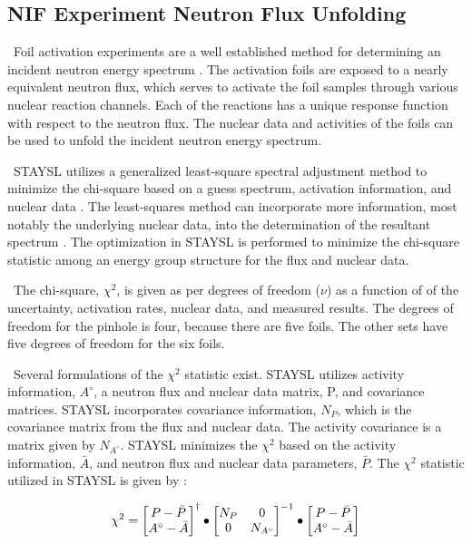\documentclass[journal]{IEEEtran}
\begin{document}
\subsection{NIF Experiment Neutron Flux Unfolding}

\ Foil activation experiments are a well established method for determining an incident neutron energy spectrum \cite{Knoll,Reginatto2010,Vagena2018b}. The activation foils are exposed to a nearly equivalent neutron flux, which serves to activate the foil samples through various nuclear reaction channels. Each of the reactions has a unique response function with respect to the neutron flux. The nuclear data and activities of the foils can be used to unfold the incident neutron energy spectrum.

\ STAYSL utilizes a generalized least-square spectral adjustment method to minimize the chi-square based on a guess spectrum, activation information, and nuclear data \cite{Perey1977}. The least-squares method can incorporate more information, most notably the underlying nuclear data, into the determination of the resultant spectrum \cite{Perey1977}. The optimization in STAYSL is performed to minimize the chi-square statistic among an energy group structure for the flux and nuclear data. 

\ The chi-square, $\chi^{2}$, is given as per degrees of freedom ($\nu$) as a function of of the uncertainty, activation rates, nuclear data, and measured results. The degrees of freedom for the pinhole is four, because there are five foils. The other sets have five degrees of freedom for the six foils. 

\ Several formulations of the $\chi^{2}$ statistic exist. STAYSL utilizes activity information, $A^{\circ}$, a neutron flux and nuclear data matrix, P, and covariance matrices. STAYSL incorporates covariance information, $N_{P}$, which is the covariance matrix from the flux and nuclear data. The activity covariance is a matrix given by $N_{A^{\circ}}$. STAYSL minimizes the $\chi^{2}$ based on the activity information, $\bar{A}$, and neutron flux and nuclear data parameters, $\bar{P}$. The $\chi^{2}$ statistic utilized in STAYSL is given by \cite{Perey1977}:
	
	\begin{equation} \label{eq:LeastSq}
	\chi^{2} = \begin{bmatrix}
	P-\bar{P} \\
	A^{\circ}-\bar{A}    
	\end{bmatrix}^{\dagger}
	\space 
	\bullet
	\space 
	\begin{bmatrix}
	N_{P}  &  0      \\
	0  &  N_{A^{\circ}}     
	\end{bmatrix}^{-1}
	\space
	\bullet
	\space
	\begin{bmatrix}
	P-\bar{P} \\
	A^{\circ}-\bar{A}    
	\end{bmatrix}
	\end{equation} 
	
\end{document}
